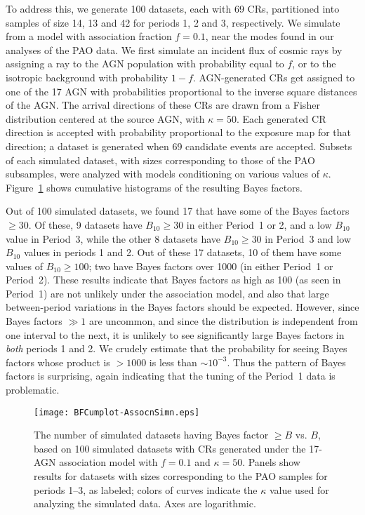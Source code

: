 To address this, we generate 100 datasets, each with 69 CRs, partitioned
into samples of size 14, 13 and 42 for periods 1, 2 and 3, respectively.  We
simulate from a model with association fraction $f=0.1$, near the modes
found in our analyses of the PAO data.  We first simulate an incident flux
of cosmic rays by assigning a ray to the AGN population with probability
equal to $f$, or to the isotropic background with probability $1-f$.
AGN-generated CRs get assigned to one of the 17 AGN with probabilities
proportional to the inverse square distances of the AGN. The arrival
directions of these CRs are drawn from a Fisher distribution centered at the
source AGN, with $\kappa = 50$.  Each generated CR direction is accepted
with probability proportional to the exposure map for that direction; a
dataset is generated when 69 candidate events are accepted.  Subsets
of each simulated dataset, with sizes corresponding to those of the
PAO subsamples, were analyzed with models conditioning on various
values of $\kappa$.  Figure~\ref{fig:assocCumBF} shows cumulative
histograms of the resulting Bayes factors.

Out of 100 simulated datasets, we found 17 that have some of the Bayes
factors $\geq 30$.  Of these, 9 datasets have $B_{10}\geq 30$ in either
Period~1 or 2, and a low $B_{10}$ value in Period~3, while the other 8
datasets have $B_{10}\geq 30$ in Period~3 and low $B_{10}$ values in periods
1 and 2.  Out of these 17 datasets, 10 of them have some values of
$B_{10}\geq 100$; two have Bayes factors over 1000 (in either Period~1
or Period~2).  
These results indicate that Bayes factors as high as 100 (as seen in
Period~1) are not unlikely under the association model, and also that
large between-period variations in the Bayes factors should be expected.
However, since Bayes factors $\gg 1$ are uncommon, and since the
distribution is independent from one interval to the next, it is
unlikely to see significantly large Bayes factors in {\em both} periods
1 and 2. We crudely estimate that the probability for seeing Bayes
factors whose product is $> 1000$ is less than $\sim 10^{-3}$.  Thus the
pattern of Bayes factors is surprising, again indicating that the tuning
of the Period~1 data is problematic.

\begin{figure}
\centerline{\texttt{[image: BFCumplot-AssocnSimn.eps]}}
\caption{The number of simulated datasets having Bayes factor $\geq B$
vs. $B$, based on 100 simulated datasets with CRs generated under the
17-AGN association model with $f=0.1$ and $\kappa=50$.  Panels show
results for datasets with sizes corresponding to the PAO samples for
periods 1--3, as labeled; colors of curves indicate the $\kappa$ value
used for analyzing the simulated data.  Axes are logarithmic.}
\label{fig:assocCumBF}
\end{figure}
